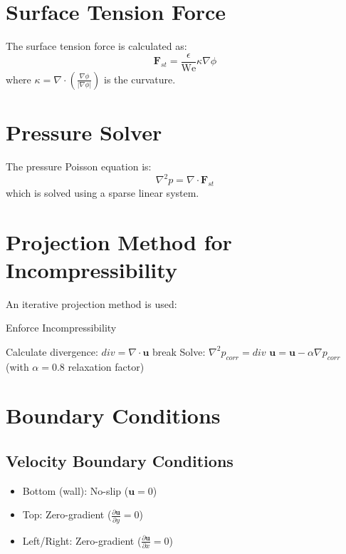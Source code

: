 \documentclass{article}
\begin{document}
\section{Surface Tension Force}
The surface tension force is calculated as:
\begin{equation}
\mathbf{F}_{st} = \frac{\epsilon}{\textrm{We}} \kappa \nabla \phi
\end{equation}
where $\kappa = \nabla \cdot \left( \frac{\nabla \phi}{|\nabla \phi|} \right)$ is the curvature.

\section{Pressure Solver}
The pressure Poisson equation is:
\begin{equation}
\nabla^2 p = \nabla \cdot \mathbf{F}_{st}
\end{equation}
which is solved using a sparse linear system.

\section{Projection Method for Incompressibility}
An iterative projection method is used:
\begin{algorithm}[H]
\caption{Enforce Incompressibility}
\begin{algorithmic}
    \STATE Calculate divergence: $div = \nabla \cdot \mathbf{u}$
        \STATE break
    \ENDIF
    \STATE Solve: $\nabla^2 p_{corr} = div$
    \STATE $\mathbf{u} = \mathbf{u} - \alpha \nabla p_{corr}$ (with $\alpha=0.8$ relaxation factor)
\ENDFOR
\end{algorithmic}
\end{algorithm}

\section{Boundary Conditions}

\subsection{Velocity Boundary Conditions}
\begin{itemize}
    \item Bottom (wall): No-slip ($\mathbf{u} = 0$)
    \item Top: Zero-gradient ($\frac{\partial \mathbf{u}}{\partial y} = 0$)
    \item Left/Right: Zero-gradient ($\frac{\partial \mathbf{u}}{\partial x} = 0$)
\end{itemize}
\end{document}

